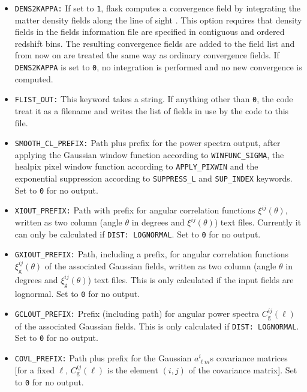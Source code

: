 \documentclass[12pt]{book} %
\newcommand{\nv}[1]{\mathrm{#1}}                 %
\begin{document}
\begin{itemize}
\item {\tt DENS2KAPPA:} If set to {\tt 1}, {\sc flask} computes a convergence field by integrating 
  the matter density fields along the line of sight \citep[see][for details]{Xavier16mn}. This 
  option requires that density fields in the fields information file are specified in contiguous 
  and ordered redshift bins. The resulting convergence fields are added to the field list and from 
  now on are treated the same way as ordinary convergence fields. If {\tt DENS2KAPPA} is set to {\tt 0}, 
  no integration is performed and no new convergence is computed. 

\item {\tt FLIST\_OUT:} This keyword takes a string. If anything other than {\tt 0}, the code 
  treat it as a filename and writes the list of fields in use by the code to this file. 

\item {\tt SMOOTH\_CL\_PREFIX:} Path plus prefix for the power spectra output, after applying the Gaussian 
  window function according to {\tt WINFUNC\_SIGMA}, the {\sc healpix} pixel window function according 
  to {\tt APPLY\_PIXWIN} and the exponential suppression according to {\tt SUPPRESS\_L} and {\tt SUP\_INDEX} 
  keywords. Set to {\tt 0} for no output.

\item {\tt XIOUT\_PREFIX:} Path with prefix for angular correlation functions $\xi^{ij}(\theta)$, 
  written as two column (angle $\theta$ in degrees and $\xi^{ij}(\theta)$) text files. 
  Currently it can only be calculated if {\tt DIST: LOGNORMAL}. Set to {\tt 0} for no output.

\item {\tt GXIOUT\_PREFIX:} Path, including a prefix, for angular correlation functions 
  $\xi^{ij}_{\nv{g}}(\theta)$ of the associated Gaussian fields, written as two column 
  (angle $\theta$ in degrees and $\xi^{ij}_{\nv{g}}(\theta)$) text files. This is only calculated if the 
  input fields are lognormal. Set to {\tt 0} for no output.

\item {\tt GCLOUT\_PREFIX:} Prefix (including path) for angular power spectra $C_{\nv{g}}^{ij}(\ell)$ 
  of the associated Gaussian fields. This is only calculated if {\tt DIST: LOGNORMAL}. 
  Set to {\tt 0} for no output.

\item {\tt COVL\_PREFIX:} Path plus prefix for the Gaussian $a^{i}_{\ell m}$s covariance matrices 
  [for a fixed $\ell$, $C_{\nv{g}}^{ij}(\ell)$ is the element $(i,j)$ of the covariance matrix]. 
  Set to {\tt 0} for no output.


\end{itemize}
\end{document}
